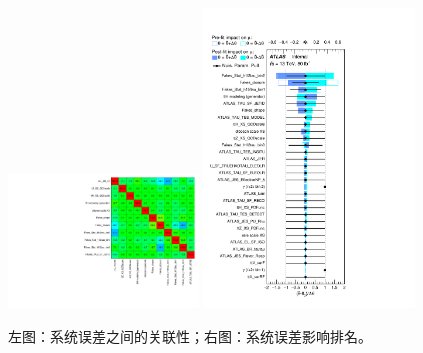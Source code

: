 \begin{figure}[htbp]
\centering
\begin{center}
  \includegraphics[width=0.45\textwidth, keepaspectratio]{fig/OneLepTwoTaus/CorrMatrix.pdf}
  \includegraphics[width=0.5\textwidth, keepaspectratio]{fig/OneLepTwoTaus/Ranking.pdf}
\end{center}
\caption{左图：系统误差之间的关联性；右图：系统误差影响排名。}
\label{Fig:1l2tau.impacts}
\end{figure}

